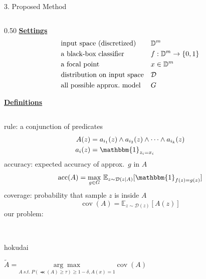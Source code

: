 \documentclass[unicode]{beamer}
\begin{document}
\begin{frame}
\begin{columns}[t]
\begin{column}{\rcol\textwidth}
\begin{block}{3. Proposed Method}
				\vspace{1.0em}
				\begin{columns}[t]
					\def\lcol{0.50}
					\def\rcol{0.48}
					\begin{column}{\lcol\textwidth}
						\underline{\textbf{Settings}}
						\begin{align*}
							 & \text{input space (discretized)}   &  & \mathbb{D}^{m}             \\
							 & \text{a black-box classifier}      &  & f:\mathbb{D}^{m}\to\{0,1\} \\
							 & \text{a focal point}               &  & x\in\mathbb{D}^{m}         \\
							 & \text{distribution on input space} &  & \mathcal{D}         \\
							 & \text{all possible approx.\ model} &  & G
						\end{align*}

						\vspace{0.8em}
						\underline{\textbf{Definitions}}

						\vspace{1.0em}
						\begin{columns}
							\begin{column}{0.95\textwidth}
								rule: a conjunction of predicates
								\begin{align*}
									A(z)   & =a_{i_1}(z)\wedge a_{i_2}(z)\wedge\dots\wedge a_{i_k}(z) \\
									a_i(z) & =\mathbbm{1}_{z_i=x_i}
								\end{align*}
								accuracy: expected accuracy of approx.\ $g$ in $A$
								\begin{equation*}
									\Prec(A)=\underset{g\in G}{\max}
									\ \mathbb{E}_{z\sim\mathcal{D}(z|A)}[\mathbbm{1}_{f(z)=g(z)}]
								\end{equation*}
								coverage: probability that sample $z$ is inside $A$
								\begin{equation*}
									\operatorname{cov}(A)=
									\mathbb{E}_{z\sim\mathcal{D}(z)}[A(z)]
								\end{equation*}
								our problem:

								\vspace{0.2em}
								\begin{center}~%
									\begin{beamercolorbox}[wd=.85\textwidth,colsep=0.1cm,rounded=true,shadow=true]{hokudai}
										\begin{center}
											$
												\tilde{A}=\underset{A\ s.t.
													\ P(\Prec(A)\ge\tau)\ge1-\delta,A(x)=1}  %
												{\arg\max}\operatorname{cov}(A)  %
											$
										\end{center}~%
									\end{beamercolorbox}


\end{center}
\end{column}
\end{columns}
\end{column}
\end{columns}
\end{block}
\end{column}
\end{columns}
\end{frame}
\end{document}
